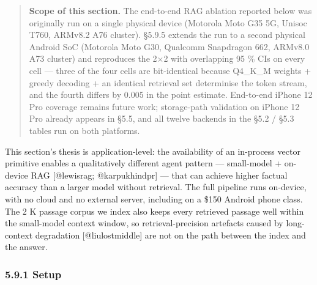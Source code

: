 \begin{quote}
\textbf{Scope of this section.} The end-to-end RAG ablation reported below was
originally run on a single physical device (Motorola Moto G35 5G, Unisoc T760,
ARMv8.2 A76 cluster). §5.9.5 extends the run to a second physical Android SoC
(Motorola Moto G30, Qualcomm Snapdragon 662, ARMv8.0 A73 cluster) and reproduces
the 2×2 with overlapping 95 \% CIs on every cell --- three of the four cells are
bit-identical because Q4\_K\_M weights + greedy decoding + an identical
retrieval set determinise the token stream, and the fourth differs by 0.005 in
the point estimate. End-to-end iPhone 12 Pro coverage remains future work;
storage-path validation on iPhone 12 Pro already appears in §5.5, and all twelve
backends in the §5.2 / §5.3 tables run on both platforms.
\end{quote}

This section's thesis is application-level: the availability of an in-process
vector primitive enables a qualitatively different agent pattern --- small-model
+ on-device RAG {[}@lewisrag; @karpukhindpr{]} --- that can achieve higher
factual accuracy than a larger model without retrieval. The full pipeline runs
on-device, with no cloud and no external server, including on a \$150 Android
phone class. The 2 K passage corpus we index also keeps every retrieved passage
well within the small-model context window, so retrieval-precision artefacts
caused by long-context degradation {[}@liulostmiddle{]} are not on the path
between the index and the answer.

\subsubsection{5.9.1 Setup}\label{setup}

